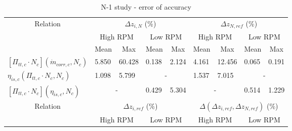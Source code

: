 \begin{longtable}[c]{@{}lclcl|clcl@{}}
\caption{N-1 study - error of accuracy}
\label{tab:C7_Nm1}\\
\toprule
\multicolumn{1}{c}{\multirow{3}{*}{Relation}} & \multicolumn{4}{c|}{$\Delta z_{i,N}$ (\%)}                                                                  & \multicolumn{4}{c}{$\Delta z_{N,ref}$ (\%)}                                                                   \\
\multicolumn{1}{c}{}                          & \multicolumn{2}{c}{High RPM}                         & \multicolumn{2}{c|}{Low RPM}                         & \multicolumn{2}{c}{High RPM}                          & \multicolumn{2}{c}{Low RPM}                           \\
\multicolumn{1}{c}{}                          & Mean                       & \multicolumn{1}{c}{Max} & Mean                      & \multicolumn{1}{c|}{Max} & Mean                        & \multicolumn{1}{c}{Max} & Mean                        & \multicolumn{1}{c}{Max} \\* \midrule
\endfirsthead
%
\endhead
%
\bottomrule
\endfoot
%
\endlastfoot
%
$[\Pi_{tt,c}\cdot N_c](\dot{m}_{corr,c},N_c)$ & \multicolumn{1}{l}{5.850}  & 60.428                  & \multicolumn{1}{l}{0.138} & 2.124                    & \multicolumn{1}{l}{4.161}   & 12.456                  & \multicolumn{1}{l}{0.065}   & 0.191                   \\
$\eta_{is,c}(\Pi_{tt,c}\cdot N_c,N_c)$        & \multicolumn{1}{l}{1.098}  & 5.799                   & \multicolumn{2}{c|}{-}                               & \multicolumn{1}{l}{1.537}   & 7.015                   & \multicolumn{2}{c}{-}                                 \\
$[\Pi_{tt,c}\cdot N_c](\eta_{is,c},N_c)$      & \multicolumn{2}{c}{-}                                & \multicolumn{1}{l}{0.429} & 5.304                    & \multicolumn{2}{c}{-}                                 & \multicolumn{1}{l}{0.514}   & 1.229                   \\* \midrule
\multicolumn{1}{c}{\multirow{3}{*}{Relation}} & \multicolumn{4}{c|}{$\Delta z_{i,ref}$ (\%)}                                                                & \multicolumn{4}{c}{$\Delta \left(\Delta z_{i,ref}, \Delta z_{N,ref}\right)$ (\%)}                             \\
\multicolumn{1}{c}{}                          & \multicolumn{2}{c}{High RPM}                         & \multicolumn{2}{c|}{Low RPM}                         & \multicolumn{2}{c}{High RPM}                          & \multicolumn{2}{c}{Low RPM}                           \\

\end{longtable}
